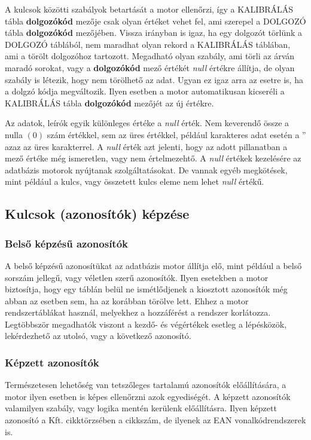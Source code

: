 \documentclass[a4paper,12pt]{report}
\begin{document}
A kulcsok közötti szabályok betartását a motor ellenőrzi, így a KALIBRÁLÁS tábla
\textbf{dolgozókód} mezője csak olyan értéket vehet fel, ami szerepel a DOLGOZÓ
tábla \textbf{dolgozókód} mezőjében. Vissza irányban is igaz, ha egy dolgozót 
törlünk a DOLGOZÓ táblából, nem maradhat olyan rekord a KALIBRÁLÁS táblában, 
ami a törölt dolgozóhoz tartozott. Megadható olyan szabály, ami törli az árván 
maradó sorokat, vagy a \textbf{dolgozókód} mező értékét \textit{null} értékre 
állítja, de olyan szabály is létezik, hogy nem törölhető az adat.
Ugyan ez igaz arra az esetre is, ha a dolgzó kódja megváltozik. Ilyen esetben 
a motor automatikusan kicseréli a KALIBRÁLÁS tábla \textbf{dolgozókód} mezőjét 
az új értékre.

Az adatok, leírók egyik különleges értéke a \textit{null} érték. Nem keverendő
össze a nulla $(0)$ szám értékkel, sem az üres értékkel, például karakteres
adat esetén a '' azaz az üres karakterrel. A \textit{null} érték azt jelenti, 
hogy az adott pillanatban a mező értéke még ismeretlen, vagy nem értelmezehtő.
A \textit{null} értékek kezelésére az adatbázis motorok nyújtanak 
szolgáltatásokat. De vannak egyéb megkötések, mint például a kulcs, vagy 
összetett kulcs eleme nem lehet \textit{null} értékű.

\subsection{Kulcsok (azonosítók) képzése}

\subsubsection{Belső képzésű azonosítók}
A belső képzésű azonosítükat az adatbázis motor állítja elő, mint például a 
belső sorszám jellegű, vagy véletlen szerű azonosítók. Ilyen esetekben a motor 
biztosítja, hogy egy táblán belül ne ismétlődjenek a kiosztott azonosítók még 
abban az esetben sem, ha az korábban törölve lett. Ehhez a motor 
rendszertáblákat használ, melyekhez a hozzáférést a rendszer korlátozza. 
Legtöbbször megadhatók viszont a kezdő- és végértékek esetleg a lépésközök, 
lekérdezhető az utolsó, vagy a következő azonosító.

\subsubsection{Képzett azonosítók}
Természetesen lehetőség van tetszőleges tartalamú azonosítók előállítására, a 
motor ilyen esetben is képes ellenőrzni azok egyediségét. A képzett azonosítók 
valamilyen szabály, vagy logika mentén kerülenk előállításra. Ilyen képzett 
azonosító a Kft. cikktörzsében a cikkszám, de ilyenek az EAN vonalkódrendszerek 
is.
\end{document}
